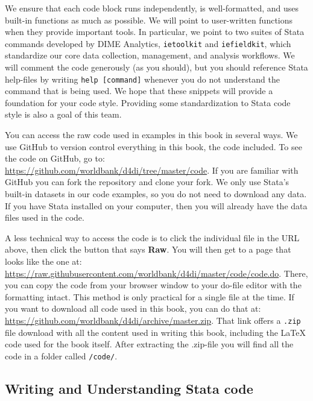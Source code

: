 
We ensure that each code block runs independently, is well-formatted,
and uses built-in functions as much as possible.
We will point to user-written functions when they provide important tools.
In particular, we point to two suites of Stata commands developed by DIME Analytics,
\texttt{ietoolkit} and
\texttt{iefieldkit},
which standardize our core data collection, management, and analysis workflows.
We will comment the code generously (as you should),
but you should reference Stata help-files by writing \texttt{help [command]}
whenever you do not understand the command that is being used.
We hope that these snippets will provide a foundation for your code style.
Providing some standardization to Stata code style is also a goal of this team.

You can access the raw code used in examples in this book in several ways.
We use GitHub to version control everything in this book, the code included.
To see the code on GitHub, go to: \url{https://github.com/worldbank/d4di/tree/master/code}.
If you are familiar with GitHub you can fork the repository and clone your fork.
We only use Stata's built-in datasets in our code examples,
so you do not need to download any data.
If you have Stata installed on your computer, then you will already have the data files used in the code.

A less technical way to access the code is to click the individual file in the URL above, then click
the button that says \textbf{Raw}. You will then get to a page that looks like the one at:
\url{https://raw.githubusercontent.com/worldbank/d4di/master/code/code.do}.
There, you can copy the code from your browser window to your do-file editor with the formatting intact.
This method is only practical for a single file at the time.
If you want to download all code used in this book, you can do that at:
\url{https://github.com/worldbank/d4di/archive/master.zip}. That link offers a \texttt{.zip} file download
with all the content used in writing this book, including the \LaTeX{} code used for the book itself. After
extracting the .zip-file you will find all the code in a folder called \texttt{/code/}.

\subsection{Writing and Understanding Stata code}

